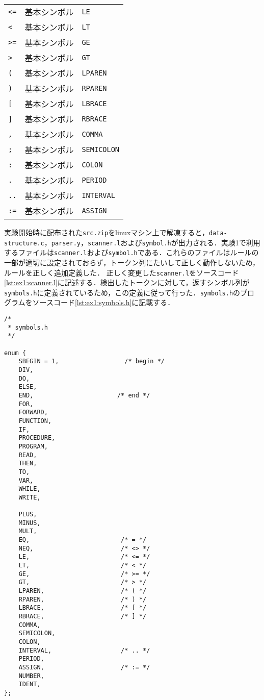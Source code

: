\documentclass[uplatex]{jsarticle}
\begin{document}
\begin{table}[tb]
\begin{center}
\begin{tabular}{|l|l|l|}
      \verb#<=# & 基本シンボル & \verb#LE# \\
      \verb#<# & 基本シンボル & \verb#LT# \\
      \verb#>=# & 基本シンボル & \verb#GE# \\
      \verb#># & 基本シンボル & \verb#GT# \\
      \verb#(# & 基本シンボル & \verb#LPAREN# \\
      \verb#)# & 基本シンボル & \verb#RPAREN# \\
      \verb#[# & 基本シンボル & \verb#LBRACE# \\
      \verb#]# & 基本シンボル & \verb#RBRACE# \\
      \verb#,# & 基本シンボル & \verb#COMMA# \\
      \verb#;# & 基本シンボル & \verb#SEMICOLON# \\
      \verb#:# & 基本シンボル & \verb#COLON# \\
      \verb#.# & 基本シンボル & \verb#PERIOD# \\
      \verb#..# & 基本シンボル & \verb#INTERVAL# \\
      \verb#:=# & 基本シンボル & \verb#ASSIGN# \\
      \hline
    \end{tabular}
    \label{tbl:token}
  \end{center}
\end{table}
実験開始時に配布された\verb#src.zip#をlinuxマシン上で解凍すると，\verb#data-structure.c#，\verb#parser.y#，\verb#scanner.l#および\verb#symbol.h#が出力される．実験1で利用するファイルは\verb#scanner.l#および\verb#symbol.h#である．これらのファイルはルールの一部が適切に設定されておらず，トークン列にたいして正しく動作しないため，ルールを正しく追加定義した．
正しく変更した\verb#scanner.l#をソースコード\ref{lst:ex1:scanner.l}に記述する．検出したトークンに対して，返すシンボル列が\verb#symbols.h#に定義されているため，この定義に従って行った．\verb#symbols.h#のプログラムをソースコード\ref{lst:ex1:symbols.h}に記載する．
\begin{lstlisting}[caption=symbol.h,label=lst:ex1:symbols.h]
/*
 * symbols.h
 */

enum {
    SBEGIN = 1,                  /* begin */
    DIV,
    DO,
    ELSE,
    END,                       /* end */
    FOR,
    FORWARD,
    FUNCTION,
    IF,
    PROCEDURE,
    PROGRAM,
    READ,
    THEN,
    TO,
    VAR,
    WHILE,
    WRITE,

    PLUS,
    MINUS,
    MULT,
    EQ,                         /* = */
    NEQ,                        /* <> */
    LE,                         /* <= */
    LT,                         /* < */
    GE,                         /* >= */
    GT,                         /* > */
    LPAREN,                     /* ( */
    RPAREN,                     /* ) */
    LBRACE,                     /* [ */
    RBRACE,                     /* ] */
    COMMA,
    SEMICOLON,
    COLON,
    INTERVAL,                   /* .. */
    PERIOD,
    ASSIGN,                     /* := */
    NUMBER,
    IDENT,
};
\end{lstlisting}
\end{document}
